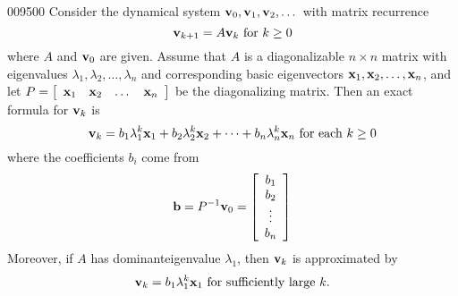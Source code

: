 \begin{theorem}{}{009500}
Consider the dynamical system $\textbf{v}_{0}, \textbf{v}_{1}, \textbf{v}_{2}, \dots$  with matrix recurrence
\begin{equation*}
\textbf{v}_{k+1} = A \textbf{v}_k \mbox{ for } k \geq 0  
\end{equation*}
where $A$ and $\textbf{v}_{0}$ are given. Assume that $A$ is a diagonalizable $n \times n$ matrix with eigenvalues $\lambda_{1}, \lambda_{2}, \dots , \lambda_{n}$ and corresponding basic eigenvectors $\textbf{x}_{1}, \textbf{x}_{2}, \dots , \textbf{x}_{n}$, and let $P = \left[ \begin{array}{cccc} \textbf{x}_{1} & \textbf{x}_{2} & \dots & \textbf{x}_{n} \end{array}\right]$ be the diagonalizing matrix. Then an exact formula for $\textbf{v}_{k}$ is
\begin{equation*}
\textbf{v}_k = b_1 \lambda_1^k \textbf{x}_1 +  b_2 \lambda_2^k \textbf{x}_2 + \cdots +  b_n \lambda_n^k \textbf{x}_n \mbox{ for each } k \geq 0
\end{equation*}
where the coefficients $b_{i}$ come from
\begin{equation*}
\textbf{b} = P^{-1} \textbf{v}_0  = \left[ \begin{array}{c}
b_1 \\
b_2 \\
\vdots \\
b_n
\end{array} \right]
\end{equation*}
Moreover, if $A$ has dominant\footnotemark eigenvalue $\lambda_{1}$,  then $\textbf{v}_{k}$ is approximated by
\begin{equation*}
\textbf{v}_k = b_1 \lambda_1^k \textbf{x}_1 \mbox{ for sufficiently large } k.
\end{equation*}
\end{theorem}

